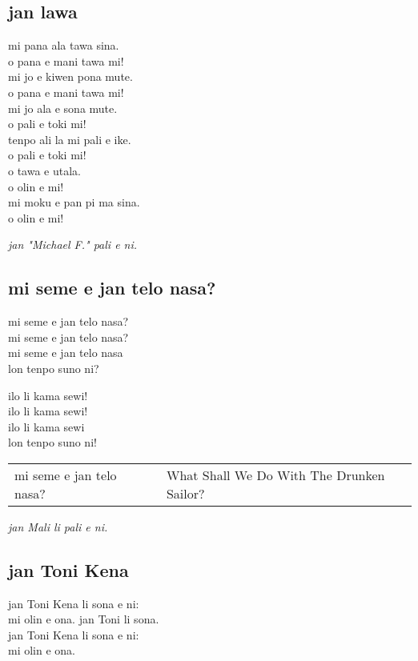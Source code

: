 \subsection{jan lawa}
mi pana ala tawa sina. \\
o pana e mani tawa mi! \\
mi jo e kiwen pona mute. \\
o pana e mani tawa mi! \\
mi jo ala e sona mute. \\
o pali e toki mi!  \\
tenpo ali la mi pali e ike. \\
o pali e toki mi! \\
o tawa e utala. \\
o olin e mi! \\
mi moku e pan pi ma sina. \\
o olin e mi!

\textit{jan "Michael F." pali e ni. \cite{www:failbluedot:01}}

\subsection{mi seme e jan telo nasa?}
mi seme e jan telo nasa? \\
mi seme e jan telo nasa? \\
mi seme e jan telo nasa \\
lon tenpo suno ni?

ilo li kama sewi! \\
ilo li kama sewi! \\
ilo li kama sewi \\
lon tenpo suno ni!

\begin{supertabular}{p{5,5cm}|ll}
    mi seme e jan telo nasa? &  & What Shall We Do With The Drunken Sailor? \\
\end{supertabular}

\textit{jan Mali li pali e ni. \cite{www:astrodonunt:01}}

\subsection{jan Toni Kena}
jan Toni Kena li sona e ni:  \\
mi olin e ona. jan Toni li sona.  \\
jan Toni Kena li sona e ni: \\
mi olin e ona.

